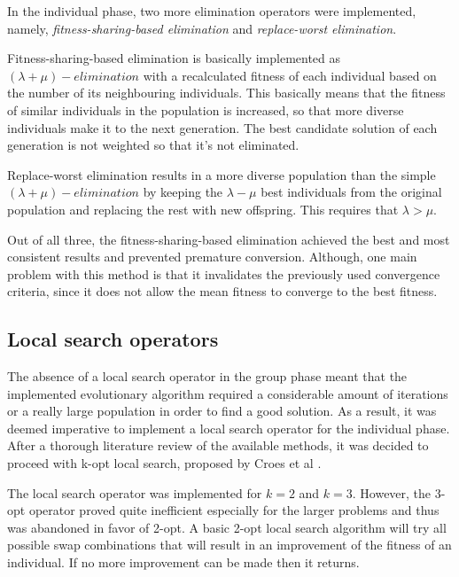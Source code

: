 \documentclass[a4paper,10pt]{article}
\newcommand{\ReplaceMe}[1]{{\color{blue}#1}}
\begin{document}
In the individual phase, two more elimination operators were implemented, namely, \textit{fitness-sharing-based elimination} and \textit{replace-worst elimination}.

Fitness-sharing-based elimination is basically implemented as $(\lambda+\mu)-elimination$ with a recalculated fitness of each individual based on the number of its neighbouring individuals. This basically means that the fitness of similar individuals in the population is increased, so that more diverse individuals make it to the next generation. The best candidate solution of each generation is not weighted so that it's not eliminated.

Replace-worst elimination results in a more diverse population than the simple $(\lambda+\mu)-elimination$ by keeping the $\lambda-\mu$ best individuals from the original population and replacing the rest with new offspring. This requires that $\lambda > \mu$.

Out of all three, the fitness-sharing-based elimination achieved the best and most consistent results and prevented premature conversion. Although, one main problem with this method is that it invalidates the previously used convergence criteria, since it does not allow the mean fitness to converge to the best fitness.

\subsection{Local search operators}

The absence of a local search operator in the group phase meant that the implemented evolutionary algorithm required a considerable amount of iterations or a really large population in order to find a good solution. As a result, it was deemed imperative to implement a local search operator for the individual phase. After a thorough literature review of the available methods, it was decided to proceed with k-opt local search, proposed by Croes et al \cite{k-opt}.

The local search operator was implemented for $k=2$ and $k=3$. However, the 3-opt operator proved quite inefficient especially for the larger problems and thus was abandoned in favor of 2-opt. A basic 2-opt local search algorithm will try all possible swap combinations that will result in an improvement of the fitness of an individual. If no more improvement can be made then it returns.
\end{document}
